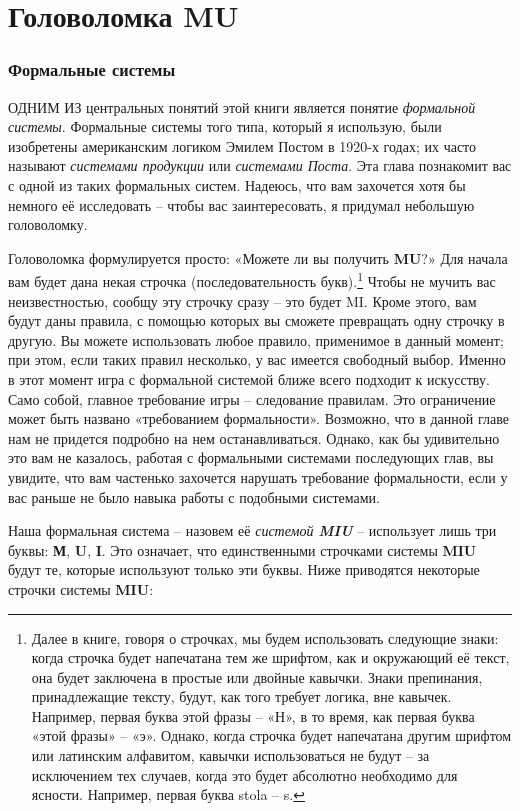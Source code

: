 \documentclass[../main.tex]{subfiles}
\begin{document}
\chapter{Головоломка MU}

\subsection{Формальные системы}

ОДНИМ ИЗ центральных понятий этой книги является понятие \emph{формальной системы}. Формальные системы того типа, который я использую, были изобретены американским логиком Эмилем Постом в 1920-х годах; их часто называют \emph{системами продукции} или \emph{системами Поста}. Эта глава познакомит вас с одной из таких формальных систем. Надеюсь, что вам захочется хотя бы немного её исследовать \--- чтобы вас заинтересовать, я придумал небольшую головоломку.

Головоломка формулируется просто: «Можете ли вы получить \textbf{MU}?»
Для начала вам будет дана некая строчка (последовательность букв).\footnote{Далее в книге, говоря о строчках, мы будем использовать следующие знаки: когда строчка будет напечатана тем же шрифтом, как и окружающий её текст, она будет заключена в простые или двойные кавычки. Знаки препинания, принадлежащие тексту, будут, как того требует логика, вне кавычек. Например, первая буква этой фразы \--- «Н», в то время, как первая буква «этой фразы» \--- «э». Однако, когда строчка будет напечатана другим шрифтом или латинским алфавитом, кавычки использоваться не будут \--- за исключением тех случаев, когда это будет абсолютно необходимо для ясности. Например, первая буква stola \--- s.}
Чтобы не мучить вас неизвестностью, сообщу эту строчку сразу \--- это будет MI.
Кроме этого, вам будут даны правила, с помощью которых вы сможете превращать одну строчку в другую.
Вы можете использовать любое правило, применимое в данный момент; при этом, если таких правил несколько, у вас имеется свободный выбор.
Именно в этот момент игра с формальной системой ближе всего подходит к искусству.
Само собой, главное требование игры \--- следование правилам.
Это ограничение может быть названо «требованием формальности».
Возможно, что в данной главе нам не придется подробно на нем останавливаться.
Однако, как бы удивительно это вам не казалось, работая с формальными системами последующих глав, вы увидите, что вам частенько захочется нарушать требование формальности, если у вас раньше не было навыка работы с подобными системами.

Наша формальная система \--- назовем её \emph{системой \textbf{MIU}} \--- использует лишь три буквы: \textbf{М}, \textbf{U}, \textbf{I}.
Это означает, что единственными строчками системы \textbf{MIU} будут те, которые используют только эти буквы.
Ниже приводятся некоторые строчки системы \textbf{MIU}:
\end{document}
